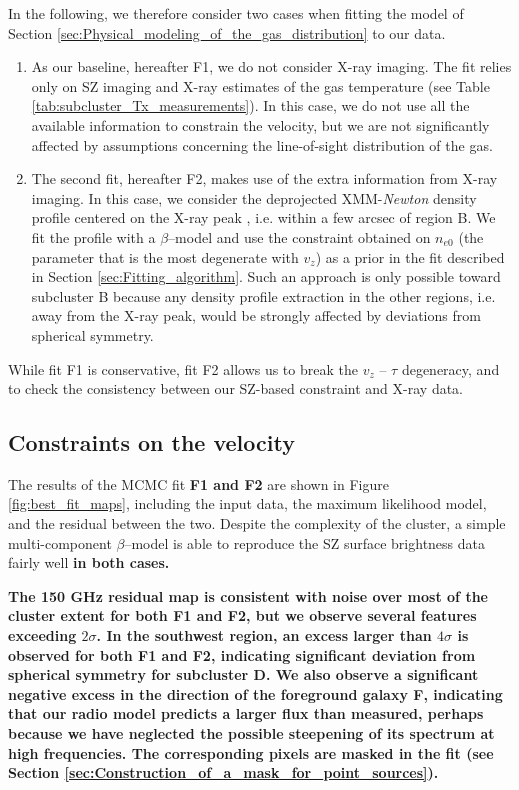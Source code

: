 \documentclass[twocolumn,traditabstract]{aa}
\begin{document}
In the following, we therefore consider two cases when fitting the model of Section \ref{sec:Physical_modeling_of_the_gas_distribution} to our data.
\begin{enumerate}
\item As our baseline, hereafter F1, we do not consider X-ray imaging. The fit relies only on SZ imaging and X-ray estimates of the gas temperature (see Table \ref{tab:subcluster_Tx_measurements}). In this case, we do not use all the available information to constrain the velocity, but we are not significantly affected by assumptions concerning the line-of-sight distribution of the gas.
\item The second fit, hereafter F2, makes use of the extra information from X-ray imaging. In this case, we consider the deprojected XMM-\textit{Newton} density profile centered on the X-ray peak \citep[extracted as in][]{Adam2016}, i.e. within a few arcsec of region B. We fit the profile with a $\beta$--model and use the constraint obtained on $n_{e0}$ (the parameter that is the most degenerate with $v_z$) as a prior in the fit described in Section \ref{sec:Fitting_algorithm}. Such an approach is only possible toward subcluster B because any density profile extraction in the other regions, i.e. away from the X-ray peak, would be strongly affected by deviations from spherical symmetry.
\end{enumerate}
While fit F1 is conservative, fit F2 allows us to break the $v_z$ -- $\tau$ degeneracy, and to check the consistency between our SZ-based constraint and X-ray data.

\subsection{Constraints on the velocity}\label{sec:Constraints_on_the_velocity}
The results of the MCMC fit {\bf F1 and F2} are shown in Figure \ref{fig:best_fit_maps}, including the input data, the maximum likelihood model, and the residual between the two. Despite the complexity of the cluster, a simple multi-component $\beta$--model is able to reproduce the SZ surface brightness data fairly well {\bf in both cases.}

{\bf The 150 GHz residual map is consistent with noise over most of the cluster extent for both F1 and F2, but we observe several features exceeding $2 \sigma$. In the southwest region, an excess larger than $4 \sigma$ is observed for both F1 and F2, indicating significant deviation from spherical symmetry for subcluster D. We also observe a significant negative excess in the direction of the foreground galaxy F, indicating that our radio model predicts a larger flux than measured, perhaps because we have neglected the possible steepening of its spectrum at high frequencies. The corresponding pixels are masked in the fit (see Section \ref{sec:Construction_of_a_mask_for_point_sources}).}
\end{document}
